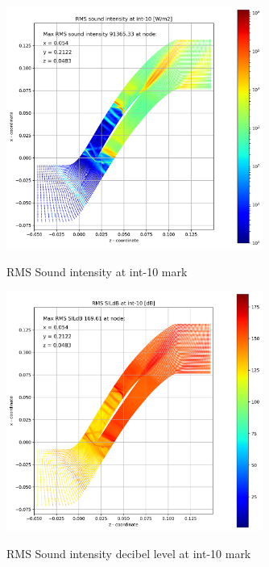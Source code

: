 \begin{figure}[ht]
  \centering
  \includegraphics[width=0.75\textwidth]{Figures/int-10-rms-sil.png} \label{int-10-rms-sil}
  \caption{RMS Sound intensity at int-10 mark}
  
  \vspace*{\floatsep}%

  \includegraphics[width=0.75\textwidth]{Figures/int-10-rms-sildb.png} \label{int-10-rms-sildb}
  \caption{RMS Sound intensity decibel level at int-10 mark}
\end{figure}


